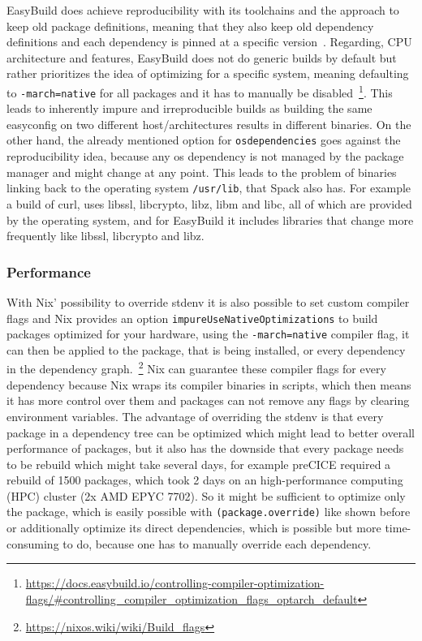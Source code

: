 \documentclass[conference,final,a4paper]{IEEEtran}
\begin{document}
EasyBuild does achieve reproducibility with its toolchains and the approach to keep old package definitions, meaning that they also keep old dependency definitions and each dependency is pinned at a specific version~\cite{Geimer_2014}.
Regarding, CPU architecture and features, EasyBuild does not do generic builds by default but rather prioritizes the idea of optimizing for a specific system, meaning defaulting to \texttt{-march=native} for all packages and it has to manually be disabled~\footnote{\url{https://docs.easybuild.io/controlling-compiler-optimization-flags/\#controlling\_compiler\_optimization\_flags\_optarch\_default}}.
This leads to inherently impure and irreproducible builds as building the same easyconfig on two different host/architectures results in different binaries.
On the other hand, the already mentioned option for \texttt{osdependencies} goes against the reproducibility idea, because any os dependency is not managed by the package manager and might change at any point.
This leads to the problem of binaries linking back to the operating system \texttt{/usr/lib}, that Spack also has.
For example a build of curl, uses libssl, libcrypto, libz, libm and libc, all of which are provided by the operating system, and for EasyBuild it includes libraries that change more frequently like libssl, libcrypto and libz.\\

\subsubsection{Performance}

With Nix' possibility to override stdenv it is also possible to set custom compiler flags and Nix provides an option \texttt{impureUseNativeOptimizations} to build packages optimized for your hardware, using the \texttt{-march=native} compiler flag, it can then be applied to the package, that is being installed, or every dependency in the dependency graph.~\footnote{\url{https://nixos.wiki/wiki/Build_flags}}
Nix can guarantee these compiler flags for every dependency because Nix wraps its compiler binaries in scripts, which then means it has more control over them and packages can not remove any flags by clearing environment variables.
The advantage of overriding the stdenv is that every package in a dependency tree can be optimized which might lead to better overall performance of packages, but it also has the downside that every package needs to be rebuild which might take several days, for example preCICE required a rebuild of 1500 packages, which took 2 days on an high-performance computing (HPC) cluster (2x AMD EPYC 7702).
So it might be sufficient to optimize only the package, which is easily possible with \texttt{(package.override)} like shown before or additionally optimize its direct dependencies, which is possible but more time-consuming to do, because one has to manually override each dependency.
\end{document}
